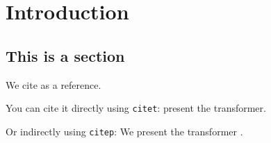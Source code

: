 \chapter{Introduction}\label{ch:Introduction}


\section{This is a section}

We cite \cite{vaswani2017attention} as a reference.

You can cite it directly using \texttt{citet}: \citet{vaswani2017attention} present the transformer.

Or indirectly using \texttt{citep}: We present the transformer \citep{vaswani2017attention}.